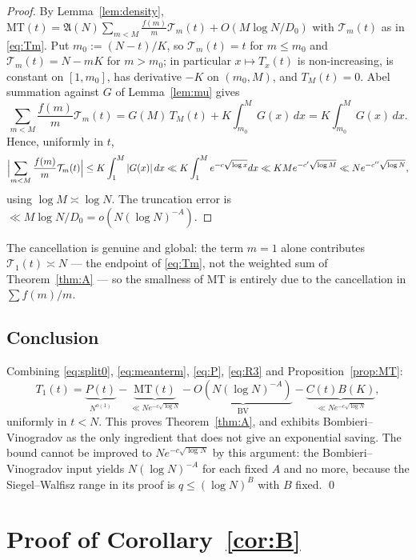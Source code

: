 \documentclass[11pt,a4paper]{article}
\theoremstyle{plain}
\theoremstyle{definition}
\theoremstyle{remark}
\newcommand{\AAA}{\mathfrak{A}}
\newcommand{\Tcut}{\mathcal T}
\begin{document}
\begin{proof}
By Lemma~\ref{lem:density},
$\mathrm{MT}(t)=\AAA(N)\sum_{m<M}\frac{f(m)}{m}\Tcut_m(t)
+O(M\log N/D_0)$ with $\Tcut_m(t)$ as in \eqref{eq:Tm}. Put
$m_0:=(N-t)/K$, so $\Tcut_m(t)=t$ for $m\le m_0$ and
$\Tcut_m(t)=N-mK$ for
$m>m_0$; in particular $x\mapsto T_x(t)$ is non-increasing, is
constant on $[1,m_0]$, has derivative $-K$ on $(m_0,M)$, and
$T_M(t)=0$. Abel summation against $G$ of Lemma~\ref{lem:mu} gives
\[
  \sum_{m<M}\frac{f(m)}{m}\Tcut_m(t)
  = G(M)\,T_M(t)+K\!\int_{m_0}^{M}\!G(x)\,dx
  = K\!\int_{m_0}^{M}\!G(x)\,dx .
\]
Hence, uniformly in $t$,
\[
  \Bigl|\sum_{m<M}\frac{f(m)}{m}\Tcut_m(t)\Bigr|
  \le K\int_{1}^{M}|G(x)|\,dx
  \ll K\int_1^M e^{-c\sqrt{\log x}}dx
  \ll KMe^{-c'\sqrt{\log M}}\ll Ne^{-c''\sqrt{\log N}},
\]
using $\log M\asymp\log N$. The truncation error is
$\ll M\log N/D_0=o(N(\log N)^{-A})$.
\end{proof}

The cancellation is genuine and global: the term $m=1$ alone
contributes $\Tcut_1(t)\asymp N$ --- the endpoint of \eqref{eq:Tm}, not
the weighted sum of Theorem~\ref{thm:A} --- so the smallness of
$\mathrm{MT}$ is
entirely due to the cancellation in $\sum f(m)/m$.

\subsection{Conclusion}

Combining \eqref{eq:split0}, \eqref{eq:meanterm}, \eqref{eq:P},
\eqref{eq:R3} and Proposition~\ref{prop:MT}:
\[
  T_1(t)=\underbrace{P(t)}_{N^{o(1)}}
         -\underbrace{\mathrm{MT}(t)}_{\ll Ne^{-c\sqrt{\log N}}}
         -\underbrace{O\!\left(N(\log N)^{-A}\right)}_{\text{BV}}
         -\underbrace{C(t)B(K)}_{\ll Ne^{-c\sqrt{\log N}}},
\]
uniformly in $t<N$. This proves Theorem~\ref{thm:A}, and exhibits
Bombieri--Vinogradov as the only ingredient that does not give an
exponential saving. The bound cannot be improved to
$Ne^{-c\sqrt{\log N}}$ by this argument: the Bombieri--Vinogradov
input yields $N(\log N)^{-A}$ for each fixed $A$ and no more, because
the Siegel--Walfisz range in its proof is $q\le(\log N)^{B}$ with $B$
fixed. \qed

\section{Proof of \texorpdfstring{Corollary~\ref{cor:B}}{the corollary}}
\end{document}
